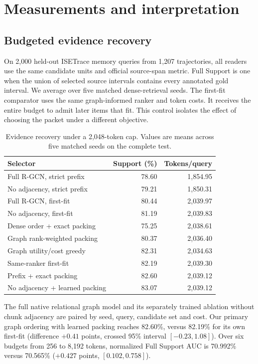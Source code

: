 \documentclass[conference]{IEEEtran}
\begin{document}
\section{Measurements and interpretation}
\subsection{Budgeted evidence recovery}
On 2,000 held-out ISETrace memory queries from 1,207 trajectories, all readers use the same candidate units and official source-span metric. Full Support is one when the union of selected source intervals contains every annotated gold interval. We average over five matched dense-retrieval seeds. The first-fit comparator uses the same graph-informed ranker and token costs. It receives the entire budget to admit later items that fit. This control isolates the effect of choosing the packet under a different objective.

\begin{table}[t]
\caption{Evidence recovery under a 2,048-token cap. Values are means across five matched seeds on the complete test.}
\centering\small
\begin{tabular}{lrr}\toprule
Selector & Support (\%) & Tokens/query\\\midrule
Full R-GCN, strict prefix & 78.60 & 1,854.95\\
No adjacency, strict prefix & 79.21 & 1,850.31\\
Full R-GCN, first-fit & 80.44 & 2,039.97\\
No adjacency, first-fit & 81.19 & 2,039.83\\\midrule
Dense order + exact packing & 75.25 & 2,038.61\\
Graph rank-weighted packing & 80.37 & 2,036.40\\
Graph utility/cost greedy & 82.31 & 2,034.63\\
Same-ranker first-fit & 82.19 & 2,039.30\\
Prefix + exact packing & 82.60 & 2,039.12\\
No adjacency + learned packing & 83.07 & 2,039.12\\
\bottomrule\end{tabular}
\label{tab:retrieval}
\end{table}

The full native relational graph model and its separately trained ablation without chunk adjacency are paired by seed, query, candidate set and cost. Our primary graph ordering with learned packing reaches 82.60\%, versus 82.19\% for its own first-fit (difference $+0.41$ points, crossed 95\% interval $[-0.23,1.08]$). Over six budgets from 256 to 8,192 tokens, normalized Full Support AUC is 70.992\% versus 70.565\% ($+0.427$ points, $[0.102,0.758]$).
\end{document}
